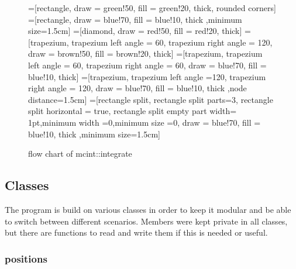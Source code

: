 \documentclass[a4paper,10pt]{article}
\begin{document}
  \begin{figure}[!htbp]
  \centering
   \label{PAP_int}
   
    	=[rectangle, 	draw = green!50, 	fill = green!20, thick, rounded corners]
  		=[rectangle, 	draw = blue!70, 	fill = blue!10, thick ,minimum size=1.5cm]
  		=[diamond, 	draw = red!50,		fill = red!20, thick]
  		=[trapezium, trapezium left angle = 60, trapezium right angle = 120,	draw = brown!50,	fill = brown!20, thick] %
  		=[trapezium, trapezium left angle = 60, trapezium right angle =  60,	draw = blue!70,		fill = blue!10, thick]
  		=[trapezium, trapezium left angle =120, trapezium right angle = 120,	draw = blue!70,		fill = blue!10, thick ,node distance=1.5cm]
  		=[rectangle split, rectangle split parts=3, rectangle split horizontal = true,
				  rectangle split empty part width= 1pt,minimum width =0,minimum size =0,  	draw = blue!70, 	fill = blue!10, thick ,minimum size=1.5cm]
   
   

 
 
\caption{flow chart of mcint::integrate} 
\end{figure}




\subsection{Classes}

The program is build on  various classes in order to keep it modular and be able to switch between different scenarios. 
Members were kept private in all classes, but there are functions to read and write them if this is needed or useful. 

\subsubsection{positions}
\end{document}

